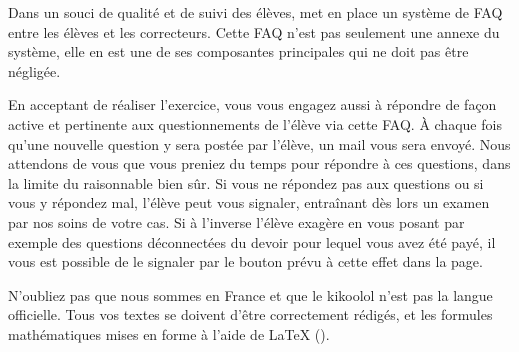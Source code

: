 ﻿Dans un souci de qualité et de suivi des élèves, \eDevoir met en place un système de FAQ entre les élèves et les correcteurs. Cette FAQ n'est pas seulement une annexe du système, elle en est une de ses composantes principales qui ne doit pas être négligée.

En acceptant de réaliser l'exercice, vous vous engagez aussi à répondre de façon active et pertinente aux questionnements de l'élève via cette FAQ. À chaque fois qu'une nouvelle question y sera postée par l'élève, un mail vous sera envoyé. Nous attendons de vous que vous preniez du temps pour répondre à ces questions, dans la limite du raisonnable bien sûr.
Si vous ne répondez pas aux questions ou si vous y répondez mal, l'élève peut vous signaler, entraînant dès lors un examen par nos soins de votre cas. Si à l'inverse l'élève exagère en vous posant par exemple des questions déconnectées du devoir pour lequel vous avez été payé, il vous est possible de le signaler par le bouton prévu à cette effet dans la page.

N'oubliez pas que nous sommes en France et que le kikoolol n'est pas la langue officielle. Tous vos textes se doivent d'être correctement rédigés, et les formules mathématiques mises en forme à l'aide de LaTeX ().